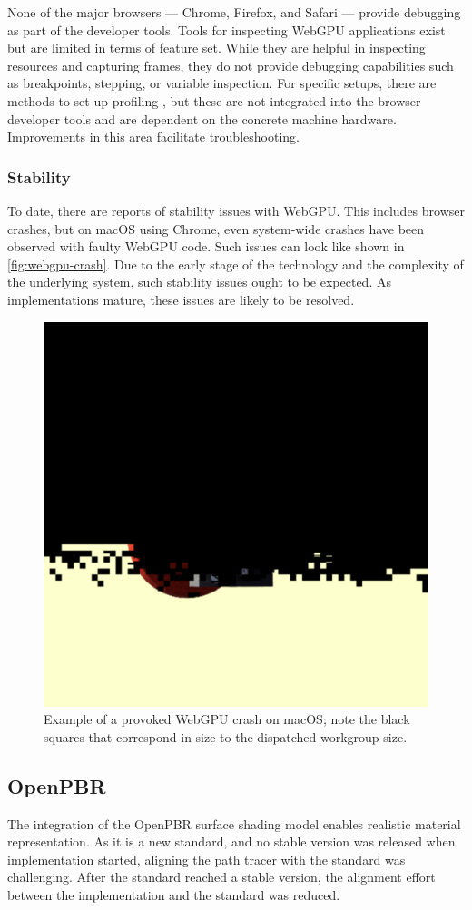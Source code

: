 None of the major browsers — Chrome, Firefox, and Safari — provide debugging as part of the developer tools. Tools for inspecting \gls{WebGPU} applications exist \cite{webGpuDevToolsDuncan, webGpuDevToolsTakahiro} but are limited in terms of feature set. While they are helpful in inspecting resources and capturing frames, they do not provide debugging capabilities such as breakpoints, stepping, or variable inspection. For specific setups, there are methods to set up profiling \cite{webGpuProfilingWithPix}, but these are not integrated into the browser developer tools and are dependent on the concrete machine hardware. Improvements in this area facilitate troubleshooting.

\subsubsection*{Stability}

To date, there are reports of stability issues with \gls{WebGPU}. This includes browser crashes, but on macOS using Chrome, even system-wide crashes have been observed with faulty \gls{WebGPU} code. Such issues can look like shown in \autoref{fig:webgpu-crash}. Due to the early stage of the technology and the complexity of the underlying system, such stability issues ought to be expected. As implementations mature, these issues are likely to be resolved.

\begin{figure}[H]
  \centering
  \includegraphics[width=0.3\columnwidth]{resources/webgpu-crashes.png}
  \caption{Example of a provoked \gls{WebGPU} crash on macOS; note the black squares that correspond in size to the dispatched workgroup size.}
  \label{fig:webgpu-crash}
\end{figure}

\subsection*{OpenPBR}

The integration of the \gls{OpenPBR} surface shading model enables realistic material representation. As it is a new standard, and no stable version was released when implementation started, aligning the path tracer with the standard was challenging. After the standard reached a stable version, the alignment effort between the implementation and the standard was reduced.

